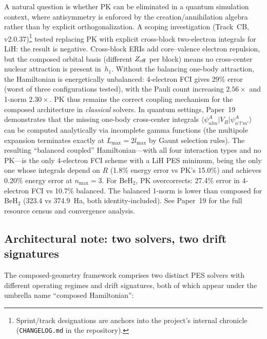 \documentclass[aps,pra,twocolumn,superscriptaddress,longbibliography,floatfix]{revtex4-2}
\begin{document}
A natural question is whether PK can be eliminated in a quantum
simulation context, where antisymmetry is enforced by the
creation/annihilation algebra rather than by explicit orthogonalization.
A scoping investigation (Track~CB, v2.0.37)\footnote{Sprint/track designations are anchors into the project's internal chronicle (\texttt{CHANGELOG.md} in the repository).} tested replacing PK with
explicit cross-block two-electron integrals for LiH:
the result is negative.  Cross-block ERIs add core--valence electron
repulsion, but the composed orbital basis (different $Z_{\rm eff}$ per
block) means no cross-center nuclear attraction is present in~$h_1$.
Without the balancing one-body attraction, the Hamiltonian is
energetically unbalanced: 4-electron FCI gives 29\% error (worst
of three configurations tested), with the Pauli count increasing
$2.56\times$ and 1-norm $2.30\times$.  PK thus remains the correct
coupling mechanism for the composed architecture in \emph{classical}
solvers.  In quantum settings, Paper~19~\cite{loutey_paper19}
demonstrates that the missing one-body cross-center integrals
$\langle \psi_{nlm}^A | V_B | \psi_{n'l'm'}^A \rangle$ can be
computed analytically via incomplete gamma functions (the multipole
expansion terminates exactly at $L_{\max} = 2 l_{\max}$ by Gaunt
selection rules).  The resulting ``balanced coupled''
Hamiltonian---with all four interaction types and no PK---is the only
4-electron FCI scheme with a LiH PES minimum, being the only one whose
integrals depend on $R$ (1.8\% energy error vs
PK's 15.0\%) and achieves 0.20\% energy error at $n_{\max} = 3$.
For BeH$_2$, PK overcorrects: 27.4\% error in 4-electron FCI vs
10.7\% balanced.  The balanced 1-norm is lower than composed for
BeH$_2$ (323.4 vs 374.9~Ha, both identity-included).  See Paper~19
for the full resource
census and convergence analysis.

\subsection{Architectural note: two solvers, two drift signatures}
\label{sec:two_solvers}

The composed-geometry framework comprises two distinct PES solvers with
different operating regimes and drift signatures, both of which appear
under the umbrella name ``composed Hamiltonian'':
\end{document}
